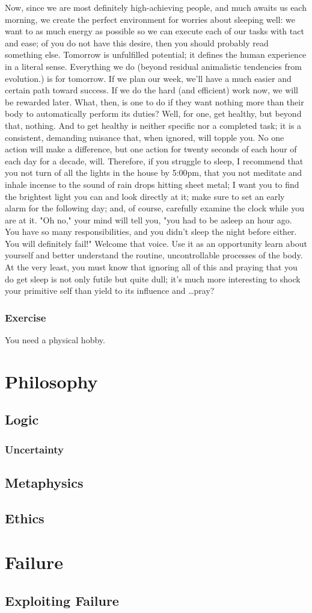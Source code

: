 \documentclass{book}
\numberwithin{equation}{section}
\begin{document}
Now, since we are most definitely high-achieving people, and much awaits us each morning, we create the perfect environment for worries about sleeping well: we want to as much energy as possible so we can execute each of our tasks with tact and ease; of you do not have this desire, then you should probably read something else. Tomorrow is unfulfilled potential; it defines the human experience in a literal sense. Everything we do (beyond residual animalistic tendencies from evolution.) is for tomorrow. If we plan our week, we'll have a much easier and certain path toward success. If we do the hard (and efficient) work now, we will be rewarded later. What, then, is one to do if they want nothing more than their body to automatically perform its duties? Well, for one, get healthy, but beyond that, nothing. And to get healthy is neither specific nor a completed task; it is a consistent, demanding nuisance that, when ignored, will topple you. No one action will make a difference, but one action for twenty seconds of each hour of each day for a decade, will. 
Therefore, if you struggle to sleep, I recommend that you not turn of all the lights in the house by 5:00pm, that you not meditate and inhale incense to the sound of rain drops hitting sheet metal; I want you to find the brightest light you can and look directly at it; make sure to set an early alarm for the following day; and, of course, carefully examine the clock while you are at it. "Oh no," your mind will tell you, "you had to be asleep an hour ago. You have so many responsibilities, and you didn't sleep the night before either. You will definitely fail!" Welcome that voice. Use it as an opportunity learn about yourself and better understand the routine, uncontrollable processes of the body. At the very least, you must know that ignoring all of this and praying that you do get sleep is not only futile but quite dull; it's much more interesting to shock your primitive self than yield to its influence and \ldots pray?
\subsection{Exercise}
You need  a physical hobby.


\chapter{Philosophy}
\section{Logic}
\subsection{Uncertainty}

\section{Metaphysics}
\section{Ethics}


\chapter{Failure}
\section{Exploiting Failure}
\end{document}
